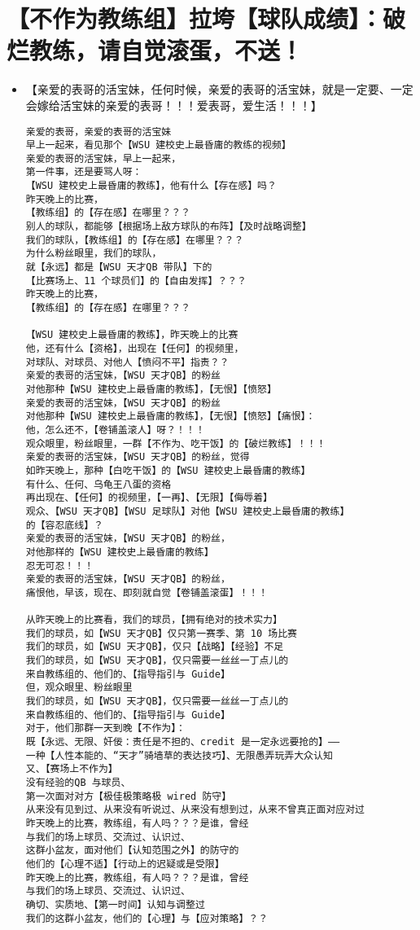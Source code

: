 \documentclass[9pt, b5paper]{article}
\begin{document}
\section{【不作为教练组】拉垮【球队成绩】：破烂教练，请自觉滚蛋，不送！}
\label{sec-11}
\begin{itemize}
\item 【亲爱的表哥的活宝妹，任何时候，亲爱的表哥的活宝妹，就是一定要、一定会嫁给活宝妹的亲爱的表哥！！！爱表哥，爱生活！！！】
\begin{verbatim}
亲爱的表哥，亲爱的表哥的活宝妹
早上一起来，看见那个【WSU 建校史上最昏庸的教练的视频】
亲爱的表哥的活宝妹，早上一起来，
第一件事，还是要骂人呀：
【WSU 建校史上最昏庸的教练】，他有什么【存在感】吗？
昨天晚上的比赛，
【教练组】的【存在感】在哪里？？？
别人的球队，都能够【根据场上敌方球队的布阵】【及时战略调整】
我们的球队，【教练组】的【存在感】在哪里？？？
为什么粉丝眼里，我们的球队，
就【永远】都是【WSU 天才QB 带队】下的
【比赛场上、11 个球员们】的【自由发挥】？？？
昨天晚上的比赛，
【教练组】的【存在感】在哪里？？？

【WSU 建校史上最昏庸的教练】，昨天晚上的比赛
他，还有什么【资格】，出现在【任何】的视频里，
对球队、对球员、对他人【愤闷不平】指责？？
亲爱的表哥的活宝妹，【WSU 天才QB】的粉丝
对他那种【WSU 建校史上最昏庸的教练】，【无恨】【愤怒】
亲爱的表哥的活宝妹，【WSU 天才QB】的粉丝
对他那种【WSU 建校史上最昏庸的教练】，【无恨】【愤怒】【痛恨】：
他，怎么还不，【卷铺盖滚人】呀？！！！
观众眼里，粉丝眼里，一群【不作为、吃干饭】的【破烂教练】！！！
亲爱的表哥的活宝妹，【WSU 天才QB】的粉丝，觉得
如昨天晚上，那种【白吃干饭】的【WSU 建校史上最昏庸的教练】
有什么、任何、乌龟王八蛋的资格
再出现在、【任何】的视频里，【一再】、【无限】【侮辱着】
观众、【WSU 天才QB】【WSU 足球队】对他【WSU 建校史上最昏庸的教练】
的【容忍底线】？
亲爱的表哥的活宝妹，【WSU 天才QB】的粉丝，
对他那样的【WSU 建校史上最昏庸的教练】
忍无可忍！！！
亲爱的表哥的活宝妹，【WSU 天才QB】的粉丝，
痛恨他，早该，现在、即刻就自觉【卷铺盖滚蛋】！！！

从昨天晚上的比赛看，我们的球员，【拥有绝对的技术实力】
我们的球员，如【WSU 天才QB】仅只第一赛季、第 10 场比赛
我们的球员，如【WSU 天才QB】，仅只【战略】【经验】不足
我们的球员，如【WSU 天才QB】，仅只需要一丝丝一丁点儿的
来自教练组的、他们的、【指导指引与 Guide】
但，观众眼里、粉丝眼里
我们的球员，如【WSU 天才QB】，仅只需要一丝丝一丁点儿的
来自教练组的、他们的、【指导指引与 Guide】
对于，他们那群一天到晚【不作为】：
既【永远、无限、奸佞：责任是不担的、credit 是一定永远要抢的】——
一种【人性本能的、“天才”骑墙草的表达技巧】、无限愚弄玩弄大众认知
又、【赛场上不作为】
没有经验的QB 与球员、
第一次面对对方【极佳极策略极 wired 防守】
从来没有见到过、从来没有听说过、从来没有想到过，从来不曾真正面对应对过
昨天晚上的比赛，教练组，有人吗？？？是谁，曾经
与我们的场上球员、交流过、认识过、
这群小盆友，面对他们【认知范围之外】的防守的
他们的【心理不适】【行动上的迟疑或是受限】
昨天晚上的比赛，教练组，有人吗？？？是谁，曾经
与我们的场上球员、交流过、认识过、
确切、实质地、【第一时间】认知与调整过
我们的这群小盆友，他们的【心理】与【应对策略】？？


\end{verbatim}
\end{itemize}
\end{document}
